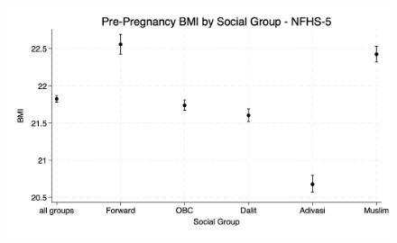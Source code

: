 \documentclass{article}
\begin{document}
\begin{figure}[H]
    \centering
    \includegraphics[width=\textwidth]{figures/bootstrapped_bmi_by_group.png}
\end{figure}














\end{document}
